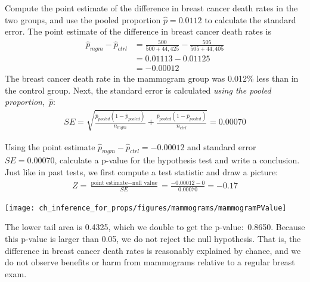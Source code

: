 \begin{example}{Compute the point estimate of the difference in breast cancer death rates in the two groups, and use the pooled proportion $\hat{p} = 0.0112$ to calculate the standard error.}
The point estimate of the difference in breast cancer death rates is
\begin{align*}
\hat{p}_{mgm} - \hat{p}_{ctrl}
	&= \frac{500}{500 + 44,425} - \frac{505}{505 + 44,405} \\
	&= 0.01113 - 0.01125 \\
	&= -0.00012
\end{align*}
The breast cancer death rate in the mammogram group was 0.012\% less than in the control group. Next, the standard error is calculated \emph{using the pooled proportion},~$\hat{p}$:
\begin{align*}
SE = \sqrt{
      \frac{\hat{p}_{\textit{pooled}}(1-\hat{p}_{\textit{pooled}})}
          {n_{mgm}}
      + \frac{\hat{p}_{\textit{pooled}}(1-\hat{p}_{\textit{pooled}})}
          {n_{ctrl}}
    }
	= 0.00070
\end{align*}
\end{example}

\newpage

\begin{example}{Using the point estimate $\hat{p}_{mgm} - \hat{p}_{ctrl} = -0.00012$ and standard error $SE = 0.00070$, calculate a p-value for the hypothesis test and write a conclusion.}
Just like in past tests, we first compute a test statistic and draw a picture:
\begin{align*}
Z = \frac{\text{point estimate} - \text{null value}}{SE}
	= \frac{-0.00012 - 0}{0.00070}
	= -0.17
\end{align*}
\begin{center}
\texttt{[image: ch\_inference\_for\_props/figures/mammograms/mammogramPValue]}
\end{center}
The lower tail area is 0.4325, which we double to get the p-value:~0.8650. Because this p-value is larger than 0.05, we do not reject the null hypothesis. That is, the difference in breast cancer death rates is reasonably explained by chance, and we do not observe benefits or harm from mammograms relative to a regular breast exam.
\end{example}

